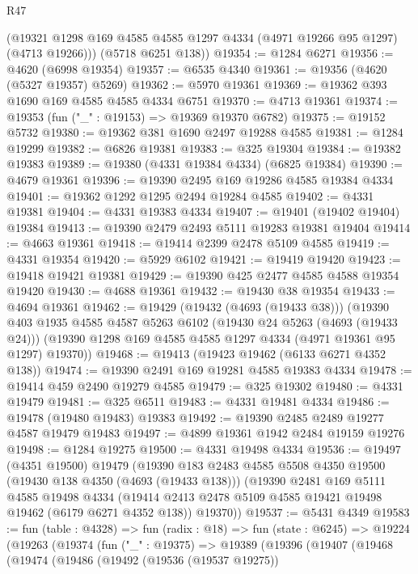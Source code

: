 \begin{lexlean}{R47}
\begin{coremodule}
        (@19321 @1298 @169 @4585 @4585 @1297 @4334 (@4971 @19266 @95 @1297) (@4713 @19266)))
      (@5718 @6251 @138))
@19354 := @1284 @6271
@19356 := @4620 (@6998 @19354)
@19357 := @6535 @4340
@19361 := @19356 (@4620 (@5327 @19357) @5269)
@19362 := @5970 @19361
@19369 := @19362 @393 @1690 @169 @4585 @4585 @4334 @6751
@19370 := @4713 @19361
@19374 := @19353 (fun ("_" : @19153) => @19369 @19370 @6782)
@19375 := @19152 @5732
@19380 := @19362 @381 @1690 @2497 @19288 @4585
@19381 := @1284 @19299
@19382 := @6826 @19381
@19383 := @325 @19304
@19384 := @19382 @19383
@19389 := @19380 (@4331 @19384 @4334) (@6825 @19384)
@19390 := @4679 @19361
@19396 := @19390 @2495 @169 @19286 @4585 @19384 @4334
@19401 := @19362 @1292 @1295 @2494 @19284 @4585
@19402 := @4331 @19381
@19404 := @4331 @19383 @4334
@19407 := @19401 (@19402 @19404) @19384
@19413 := @19390 @2479 @2493 @5111 @19283 @19381 @19404
@19414 := @4663 @19361
@19418 := @19414 @2399 @2478 @5109 @4585
@19419 := @4331 @19354
@19420 := @5929 @6102
@19421 := @19419 @19420
@19423 := @19418 @19421 @19381
@19429 := @19390 @425 @2477 @4585 @4588 @19354 @19420
@19430 := @4688 @19361
@19432 := @19430 @38 @19354
@19433 := @4694 @19361
@19462 := @19429
    (@19432 (@4693 (@19433 @38)))
    (@19390
      @403
      @1935
      @4585
      @4587
      @5263
      @6102
      (@19430 @24 @5263 (@4693 (@19433 @24)))
      (@19390 @1298 @169 @4585 @4585 @1297 @4334 (@4971 @19361 @95 @1297) @19370))
@19468 := @19413 (@19423 @19462 (@6133 @6271 @4352 @138))
@19474 := @19390 @2491 @169 @19281 @4585 @19383 @4334
@19478 := @19414 @459 @2490 @19279 @4585
@19479 := @325 @19302
@19480 := @4331 @19479
@19481 := @325 @6511
@19483 := @4331 @19481 @4334
@19486 := @19478 (@19480 @19483) @19383
@19492 := @19390 @2485 @2489 @19277 @4587 @19479 @19483
@19497 := @4899 @19361 @1942 @2484 @19159 @19276
@19498 := @1284 @19275
@19500 := @4331 @19498 @4334
@19536 := @19497
    (@4351 @19500)
    @19479
    (@19390
      @183
      @2483
      @4585
      @5508
      @4350
      @19500
      (@19430 @138 @4350 (@4693 (@19433 @138)))
      (@19390
        @2481
        @169
        @5111
        @4585
        @19498
        @4334
        (@19414 @2413 @2478 @5109 @4585 @19421 @19498 @19462 (@6179 @6271 @4352 @138))
        @19370))
@19537 := @5431 @4349
@19583 := fun (table : @4328) =>
  fun (radix : @18) =>
  fun (state : @6245) =>
  @19224
    (@19263
      (@19374
        (fun ("_" : @19375) =>
        @19389
          (@19396
            (@19407
              (@19468
                (@19474
                  (@19486
                    (@19492
                      (@19536 (@19537 @19275))

\end{coremodule}
\end{lexlean}
